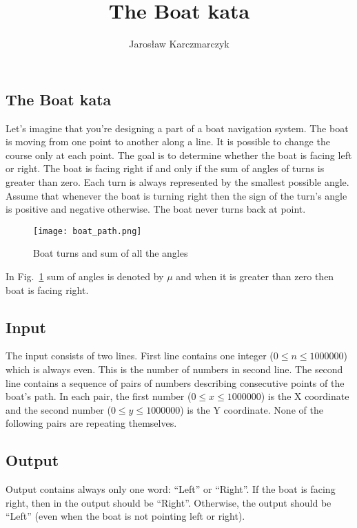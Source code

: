 \documentclass{article}
\title{The Boat kata}
\author{Jarosław Karczmarczyk}
\date{}
\begin{document}
\pagestyle{empty}
\begin{center}
  \section*{The Boat kata}
\end{center}

\noindent Let’s imagine that you’re designing a part of a boat navigation system. The boat is moving from one point to another along a line. It is possible to change the course only at each point. The goal is to determine whether the boat is facing left or right. The boat is facing right if and only if the sum of angles of turns is greater than zero. Each turn is always represented by the smallest possible angle. Assume that whenever the boat is turning right then the sign of the turn's angle is positive and negative otherwise. The boat never turns back at point.
\begin{figure}[htpb]
\begin{center}
\texttt{[image: boat\_path.png]}
\caption{Boat turns and sum of all the angles}
\label{fig:boat_path}
\end{center}
\end{figure}

\noindent In Fig.~\ref{fig:boat_path} sum of angles is denoted by $\mu$ and when it is greater than zero then boat is facing right. 

\subsection*{Input}
The input consists of two lines. First line contains one integer ($0 \leq n \leq 1000000$) which is always even. This is the number of numbers in second line. 
The second line contains a sequence of pairs of numbers describing consecutive points of the boat's path. In each pair, the first number ($0 \leq x \leq 1 000 000$) is the X coordinate and the second number ($0 \leq y \leq 1 000 000$) is the Y coordinate. None of the following pairs are repeating themselves.

\subsection*{Output}
Output contains always only one word: ``Left'' or ``Right''.
If the boat is facing right, then in the output should be ``Right''. Otherwise, the output should be ``Left'' (even when the boat is not pointing left or right).
\end{document}
